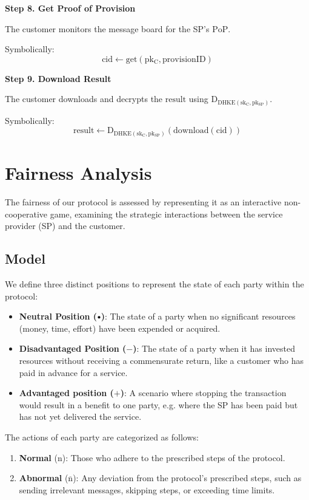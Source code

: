 \documentclass[pdftex,twocolumn,epjc3]{svjour3}
\newcommand{\normal}{\mathrm{n}}
\newcommand{\abnormal}{\overline{\mathrm{n}}}
\newcommand{\plus}{+}
\newcommand{\minus}{-}
\newcommand\neutral[1][.75]{\mathbin{\ThisStyle{\vcenter{\hbox{%
  \scalebox{#1}{$\SavedStyle\bullet$}}}}}%
}
\begin{document}
\noindent \textbf{Step 8. Get Proof of Provision}\label{step-8-get-proof-of-provision}

The customer monitors the message board for the SP's $\mathrm{PoP}$.

Symbolically: 
\[
\mathrm{cid \gets get(pk_C, provisionID)}
\]

\noindent \textbf{Step 9. Download Result}\label{step-9-download-result}

The customer downloads and decrypts the $\mathrm{result}$ using $\mathrm{D_{DHKE(sk_C, pk_{SP})}}$.

Symbolically: 
\[
\mathrm{result \gets D_{DHKE(sk_C, pk_{SP})}(download(cid))}
\]

\section{Fairness Analysis}\label{sec:fairness-analysis}
The fairness of our protocol is assessed by representing it as an interactive non-cooperative game, examining the strategic interactions between the service provider (SP) and the customer.

\subsection{Model}\label{sec:fairness-model}
We define three distinct positions to represent the state of each party within the protocol:


\begin{itemize}
\item \textbf{Neutral Position ($\neutral{}$)}: The state of a party when no significant resources (money, time, effort) have been expended or acquired.
\item \textbf{Disadvantaged Position ($\minus{}$)}: The state of a party when it has invested resources without receiving a commensurate return, like a customer who has paid in advance for a service.
\item \textbf{Advantaged position ($\plus{}$)}: A scenario where stopping the transaction would result in a benefit to one party, e.g. where the SP has been paid but has not yet delivered the service.
\end{itemize}

The actions of each party are categorized as follows:

\begin{enumerate}
\item \textbf{Normal} ($\normal{}$): Those who adhere to the prescribed steps of the protocol.
\item \textbf{Abnormal} ($\abnormal{}$): Any deviation from the protocol's prescribed steps, such as sending irrelevant messages, skipping steps, or exceeding time limits.
\end{enumerate}
\end{document}
